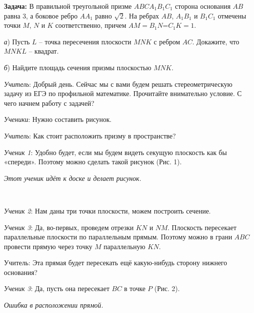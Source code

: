 \documentclass[a4paper,14pt,russian]{extreport}
\newcommand{\capt}[1]{%
    \\[8pt]
    \text{Рис. #1}
}
\begin{document}
\textbf{Задача:} В правильной треугольной призме $ABCA_1B_1C_1$ сторона основания $AB $ равна 3, а боковое ребро $AA_1$ равно $\sqrt{2}$. На ребрах $AB$, $A_1B_1$ и $B_1C_1$ отмечены точки $M$, $N$ и $K$ соответственно, причем $AM=B_1N$=$C_1K=1$.

\textit а) Пусть $L$ – точка пересечения плоскости $MNK$ с ребром $AC$. Докажите, что $MNKL$ – квадрат.

\textit б) Найдите площадь сечения призмы плоскостью $MNK$.

\vspace{0.4cm}

\textit{Учитель}: Добрый день. Сейчас мы с вами будем решать стереометрическую задачу из ЕГЭ по профильной математике. Прочитайте внимательно условие. С чего начнем работу с задачей?

\textit{Ученики}: Нужно составить рисунок.

\textit{Учитель}: Как стоит расположить призму в пространстве?

\textit{Ученик 1}: Удобно будет, если мы будем видеть секущую плоскость как бы «спереди». Поэтому можно сделать такой рисунок (Рис. 1).

\textit{Этот ученик идёт к доске и делает рисунок.}

\begin{center}
\hspace{-3.8cm}
    \begin{minipage}{0.3\textwidth}
        \centering
    \end{minipage}
    \capt{1}
\end{center}

\textit{Ученик 2}: Нам даны три точки плоскости, можем построить сечение.

\textit{Ученик 3}: Да, во-первых, проведем отрезки $KN$ и $NM$. Плоскость пересекает параллельные плоскости по параллельным прямым. Поэтому можно в грани $ABC$ провести прямую через точку $M$ параллельную $KN$.  

Учитель: Эта прямая будет пересекать ещё какую-нибудь сторону нижнего основания?

\textit{Ученик 3}: Да, пусть она пересекает $BC$ в точке $P$ (Рис. 2). 

\textit{Ошибка в расположении прямой.}

\begin{center}
\hspace{-3.8cm}
    \begin{minipage}{0.3\textwidth}
        \centering
    \end{minipage}
    \capt{2}
\end{center}
\end{document}
